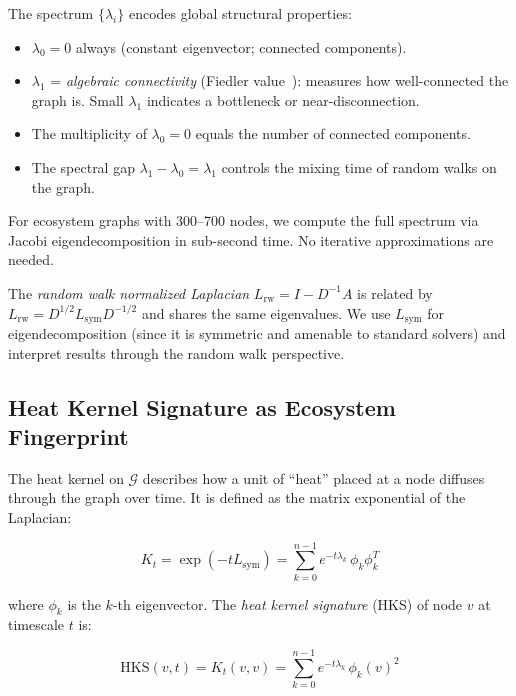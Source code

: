 \documentclass{../yalumba}
\begin{document}
The spectrum $\{\lambda_i\}$ encodes global structural properties:

\begin{itemize}
  \item $\lambda_0 = 0$ always (constant eigenvector; connected
    components).
  \item $\lambda_1$ = \emph{algebraic connectivity} (Fiedler
    value~\cite{chung1997spectral}): measures how well-connected
    the graph is.  Small $\lambda_1$ indicates a bottleneck or
    near-disconnection.
  \item The multiplicity of $\lambda_0 = 0$ equals the number of
    connected components.
  \item The spectral gap $\lambda_1 - \lambda_0 = \lambda_1$ controls
    the mixing time of random walks on the graph.
\end{itemize}

For ecosystem graphs with 300--700 nodes, we compute the full spectrum
via Jacobi eigendecomposition in sub-second time.  No iterative
approximations are needed.

The \emph{random walk normalized Laplacian} $L_{\mathrm{rw}} = I -
D^{-1}A$ is related by $L_{\mathrm{rw}} = D^{1/2} L_{\mathrm{sym}}
D^{-1/2}$ and shares the same eigenvalues.  We use $L_{\mathrm{sym}}$
for eigendecomposition (since it is symmetric and amenable to
standard solvers) and interpret results through the random walk
perspective.

\subsection{Heat Kernel Signature as Ecosystem Fingerprint}
\label{sec:framework:hks}

The heat kernel on $\mathcal{G}$ describes how a unit of ``heat''
placed at a node diffuses through the graph over time.  It is defined
as the matrix exponential of the Laplacian:

\begin{equation}
  K_t = \exp(-t L_{\mathrm{sym}})
  = \sum_{k=0}^{n-1} e^{-t \lambda_k} \, \phi_k \phi_k^T
  \label{eq:heat_kernel}
\end{equation}

where $\phi_k$ is the $k$-th eigenvector.  The \emph{heat kernel
signature} (HKS) of node $v$ at timescale $t$ is:

\begin{equation}
  \mathrm{HKS}(v, t) = K_t(v, v) = \sum_{k=0}^{n-1}
  e^{-t \lambda_k} \, \phi_k(v)^2
  \label{eq:hks}
\end{equation}
\end{document}
